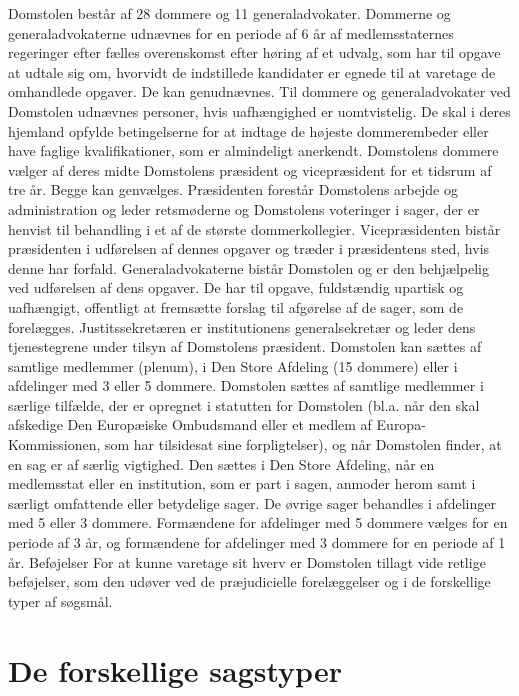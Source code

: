 \documentclass[]{book}
\begin{document}
Domstolen består af 28 dommere og 11 generaladvokater. Dommerne og generaladvokaterne udnævnes for en periode af 6 år af medlemsstaternes regeringer efter fælles overenskomst efter høring af et udvalg, som har til opgave at udtale sig om, hvorvidt de indstillede kandidater er egnede til at varetage de omhandlede opgaver. De kan genudnævnes. Til dommere og generaladvokater ved Domstolen
udnævnes personer, hvis uafhængighed er uomtvistelig. De skal i deres hjemland opfylde betingelserne
for at indtage de højeste dommerembeder eller have faglige kvalifikationer, som er almindeligt anerkendt.
Domstolens dommere vælger af deres midte Domstolens præsident og vicepræsident for et tidsrum af tre år. Begge kan genvælges. Præsidenten forestår Domstolens arbejde og administration og leder retsmøderne og Domstolens voteringer i sager, der er henvist til behandling i et af de største dommerkollegier. Vicepræsidenten bistår præsidenten i udførelsen af dennes opgaver og træder i præsidentens sted, hvis denne har forfald.
Generaladvokaterne bistår Domstolen og er den behjælpelig ved udførelsen af dens opgaver. De har til opgave, fuldstændig upartisk og uafhængigt, offentligt at fremsætte forslag til afgørelse af de sager, som de forelægges.
Justitssekretæren er institutionens generalsekretær og leder dens tjenestegrene under tilsyn af Domstolens præsident.
Domstolen kan sættes af samtlige medlemmer (plenum), i Den Store Afdeling (15 dommere) eller i afdelinger med 3 eller 5 dommere.
Domstolen sættes af samtlige medlemmer i særlige tilfælde, der er opregnet i statutten for Domstolen (bl.a. når den skal afskedige Den Europæiske Ombudsmand eller et medlem af Europa-Kommissionen, som har tilsidesat sine forpligtelser), og når Domstolen finder, at en sag er af særlig vigtighed.
Den sættes i Den Store Afdeling, når en medlemsstat eller en institution, som er part i sagen, anmoder herom samt i særligt omfattende eller betydelige sager.
De øvrige sager behandles i afdelinger med 5 eller 3 dommere. Formændene for afdelinger med 5 dommere vælges for en periode af 3 år, og formændene for afdelinger med 3 dommere for en periode af 1 år.
Beføjelser
For at kunne varetage sit hverv er Domstolen tillagt vide retlige beføjelser, som den udøver ved de præjudicielle forelæggelser og i de forskellige typer af søgsmål.

\hypertarget{de-forskellige-sagstyper}{%
\section{De forskellige sagstyper}\label{de-forskellige-sagstyper}}
\end{document}
